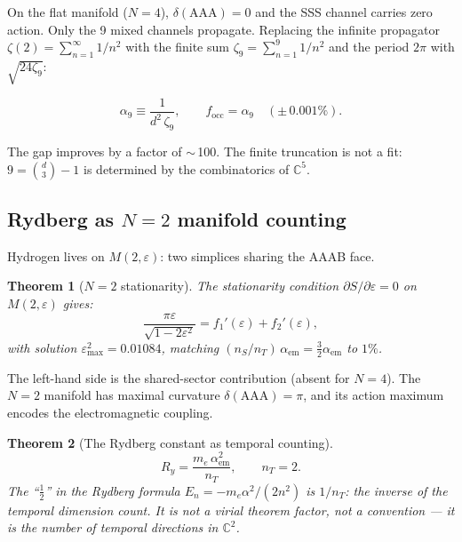 \documentclass[12pt]{article}
\newtheorem{theorem}{Theorem}[section]
\theoremstyle{remark}
\theoremstyle{definition}
\newcommand{\CC}{\mathbb{C}}
\begin{document}
On the flat manifold ($N=4$), $\delta(\mathrm{AAA}) = 0$ and the SSS channel carries zero action.  Only the 9 mixed channels propagate.  Replacing the infinite propagator $\zeta(2) = \sum_{n=1}^\infty 1/n^2$ with the finite sum $\zeta_9 = \sum_{n=1}^9 1/n^2$ and the period $2\pi$ with $\sqrt{24\zeta_9}$:

\begin{equation}
\alpha_9 \equiv \frac{1}{d^2\,\zeta_9}, \qquad
f_\mathrm{occ} = \alpha_9 \quad (\pm\,0.001\%).
\end{equation}

The gap improves by a factor of $\sim$\,100.  The finite truncation is not a fit: $9 = \binom{d}{3} - 1$ is determined by the combinatorics of $\CC^5$.

\subsection{Rydberg as $N=2$ manifold counting}
\label{sec:rydberg_N2}

Hydrogen lives on $M(2,\varepsilon)$: two simplices sharing the AAAB face.

\begin{theorem}[$N=2$ stationarity]
\label{thm:N2_stationarity}
The stationarity condition $\partial S/\partial\varepsilon = 0$ on $M(2,\varepsilon)$ gives:
\begin{equation}
\frac{\pi\varepsilon}{\sqrt{1 - 2\varepsilon^2}} = f_1'(\varepsilon) + f_2'(\varepsilon),
\end{equation}
with solution $\varepsilon_{\max}^2 = 0.01084$, matching $(n_S/n_T)\,\alpha_\text{em} = \tfrac{3}{2}\alpha_\text{em}$ to $1\%$.
\end{theorem}

The left-hand side is the shared-sector contribution (absent for $N=4$).  The $N=2$ manifold has maximal curvature $\delta(\mathrm{AAA}) = \pi$, and its action maximum encodes the electromagnetic coupling.

\begin{theorem}[The Rydberg constant as temporal counting]
\label{thm:rydberg_counting}
\begin{equation}
\boxed{R_y = \frac{m_e\,\alpha_\text{em}^2}{n_T}, \qquad n_T = 2.}
\end{equation}
The ``$\tfrac{1}{2}$'' in the Rydberg formula $E_n = -m_e\alpha^2/(2n^2)$ is $1/n_T$: the inverse of the temporal dimension count.  It is not a virial theorem factor, not a convention --- it is the number of temporal directions in $\CC^2$.
\end{theorem}
\end{document}
